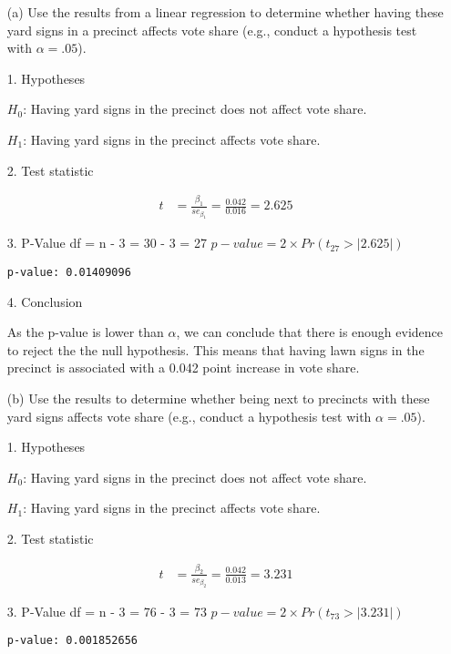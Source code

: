 \documentclass[12pt,letterpaper]{article}
\begin{document}
\vspace{.5cm}
\begin{enumerate}
	\item [(a)] Use the results from a linear regression to determine whether having these yard signs in a precinct affects vote share (e.g., conduct a hypothesis test with $\alpha = .05$).
	
	1. Hypotheses
	
	$H_0$: Having yard signs in the precinct does not affect vote share.
	
	$H_1$: Having yard signs in the precinct affects vote share.
	
	2. Test statistic
	
	\begin{align*}
		t &= \frac{\beta_1}{se_{\beta_1}} = \frac{0.042}{0.016} = 2.625
	\end{align*}
	
	3. P-Value
		df = n - 3 = 30 - 3 = 27
		$p-value = 2 \times Pr(t_{27} > |2.625|)$
		
		
		\texttt{p-value: 0.01409096 
		}
		
	4. Conclusion
	
	As the p-value is lower than $\alpha$, we can conclude that there is enough evidence to reject the the null hypothesis. This means that having lawn signs in the precinct is associated with a 0.042 point increase in vote share. 
	
	\item [(b)]  Use the results to determine whether being
	next to precincts with these yard signs affects vote
	share (e.g., conduct a hypothesis test with $\alpha = .05$).
	
	1. Hypotheses
	
	$H_0$: Having yard signs in the precinct does not affect vote share.
	
	$H_1$: Having yard signs in the precinct affects vote share.
	
2. Test statistic

	\begin{align*}
	t &= \frac{\beta_2}{se_{\beta_2}} = \frac{0.042}{0.013} = 3.231
	\end{align*}

	3. P-Value
	df = n - 3 = 76 - 3 = 73
	$p-value = 2 \times Pr(t_{73} > |3.231|)$

	
	\texttt{p-value: 0.001852656}
	

\end{enumerate}
\end{document}
